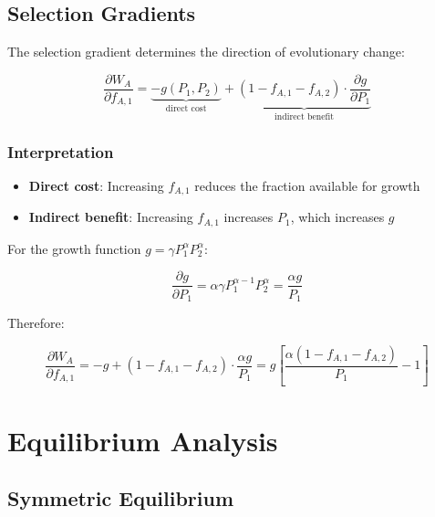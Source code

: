\documentclass[11pt]{article}
\theoremstyle{definition}
\theoremstyle{remark}
\newcommand{\pd}[2]{\frac{\partial #1}{\partial #2}}
\begin{document}
\subsection{Selection Gradients}

The selection gradient determines the direction of evolutionary change:

\begin{equation}
\pd{W_A}{f_{A,1}} = \underbrace{-g(P_1, P_2)}_{\text{direct cost}} + \underbrace{(1 - f_{A,1} - f_{A,2}) \cdot \pd{g}{P_1}}_{\text{indirect benefit}} \label{eq:gradient}
\end{equation}

\subsubsection{Interpretation}

\begin{itemize}
    \item \textbf{Direct cost}: Increasing $f_{A,1}$ reduces the fraction available for growth
    \item \textbf{Indirect benefit}: Increasing $f_{A,1}$ increases $P_1$, which increases $g$
\end{itemize}

For the growth function $g = \gamma P_1^{\alpha} P_2^{\alpha}$:

\begin{equation}
\pd{g}{P_1} = \alpha \gamma P_1^{\alpha-1} P_2^{\alpha} = \frac{\alpha g}{P_1}
\end{equation}

Therefore:

\begin{equation}
\pd{W_A}{f_{A,1}} = -g + (1 - f_{A,1} - f_{A,2}) \cdot \frac{\alpha g}{P_1} = g \left[ \frac{\alpha(1 - f_{A,1} - f_{A,2})}{P_1} - 1 \right] \label{eq:grad_explicit}
\end{equation}

\section{Equilibrium Analysis}

\subsection{Symmetric Equilibrium}
\end{document}
